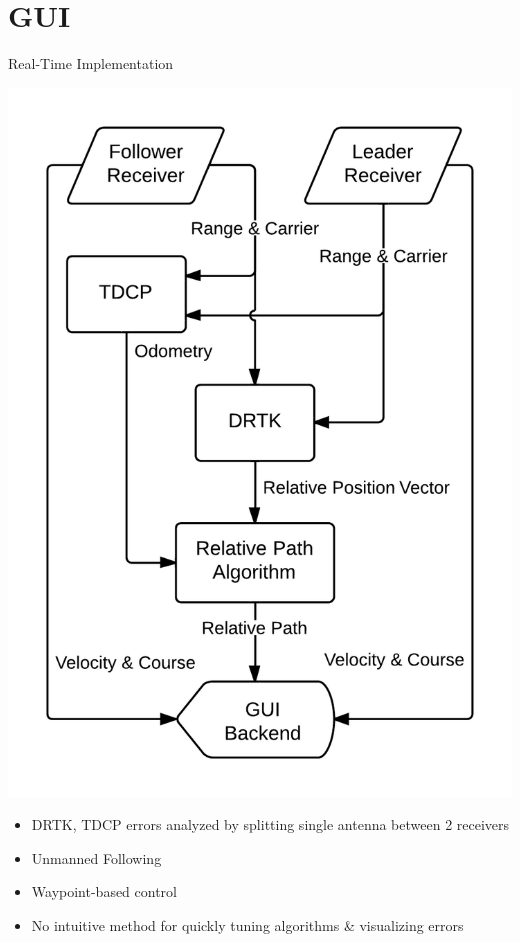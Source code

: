 \documentclass{beamer}
\begin{document}

\section{GUI}

    \begin{frame}{Real-Time Implementation}
      \begin{minipage}{0.45\textwidth}
        \centering
        \includegraphics[width=\textwidth]{../graphics/data_algo.png}
      \end{minipage}
      \begin{minipage}{0.45\textwidth}
        \begin{itemize} \small
          \item DRTK, TDCP errors analyzed by splitting single antenna between 2 receivers
          \item Unmanned Following
          \item Waypoint-based control
          \item No intuitive method for quickly tuning algorithms \& visualizing errors
        \end{itemize}
      \end{minipage}
    \end{frame}
\end{document}
